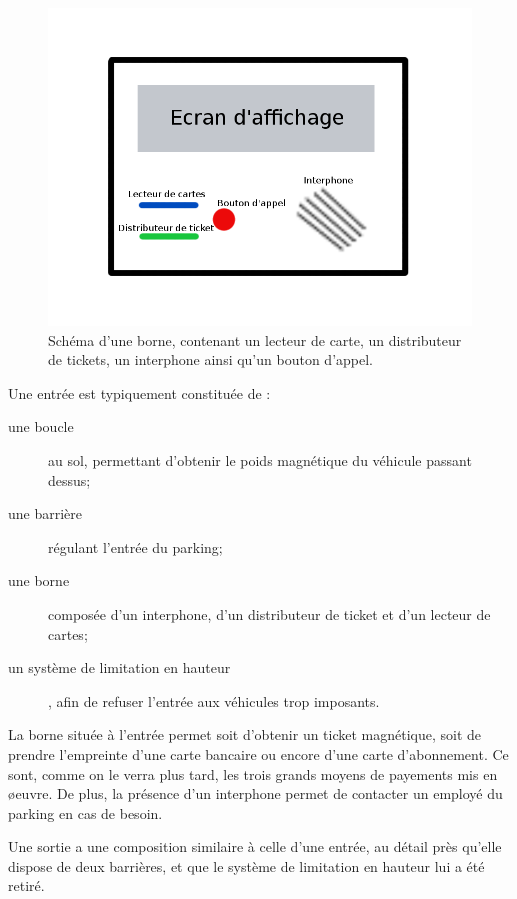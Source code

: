 \documentclass[a4paper]{article}
\begin{document}
\begin{figure}[!ht]
	\centering
	\includegraphics[scale=.4]{imgs/borne.png}
	\caption{\label{borne} Sch\'ema d'une borne, contenant un lecteur de carte,
	un distributeur de tickets, un interphone ainsi qu'un bouton d'appel.}
\end{figure}

Une entr\'ee est typiquement constitu\'ee de :
\begin{description}
	\item[une boucle] au sol, permettant d'obtenir le poids magn\'etique du v\'ehicule
		passant dessus;
	\item[une barri\`ere] r\'egulant l'entr\'ee du parking;
	\item[une borne] compos\'ee d'un interphone, d'un distributeur de ticket et d'un
		lecteur de cartes;
	\item[un syst\`eme de limitation en hauteur], afin de refuser l'entr\'ee aux
		v\'ehicules trop imposants.
\end{description}

La borne situ\'ee \`a l'entr\'ee permet soit d'obtenir un ticket magn\'etique, soit de
prendre l'empreinte d'une carte bancaire ou encore d'une carte d'abonnement. Ce sont,
comme on le verra plus tard, les trois grands moyens de payements mis en \o euvre. De
plus, la pr\'esence d'un interphone permet de contacter un employ\'e du parking en
cas de besoin.

Une sortie a une composition similaire \`a celle d'une entr\'ee, au d\'etail pr\`es
qu'elle dispose de deux barri\`eres, et que le syst\`eme de limitation en hauteur
lui a \'et\'e retir\'e.
\end{document}
